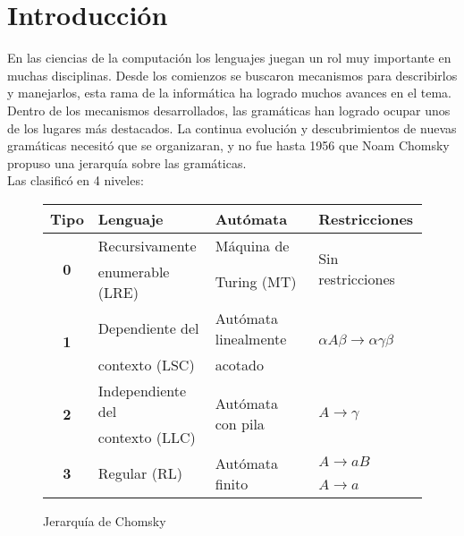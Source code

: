 \chapter{Introducción}
\label{chap:intro}
\minitoc

En las ciencias de la computación los lenguajes juegan un rol muy importante en muchas disciplinas. Desde los comienzos
se buscaron mecanismos para describirlos y manejarlos, esta rama de la informática ha logrado muchos avances en el tema.
Dentro de los mecanismos desarrollados, las gramáticas han logrado ocupar unos de los lugares más destacados. La continua 
evolución y descubrimientos de nuevas gramáticas necesitó que se organizaran, y no fue hasta 1956 que Noam Chomsky propuso
una jerarquía sobre las gramáticas.\\
Las clasificó en 4 niveles:\\

\begin{figure}[h!]\centering 
\begin{tabular}{| c | p{3.5cm} | p{4cm} | p{3cm} |}
\hline

\rowcolor{gris} \textbf{Tipo} & \textbf{Lenguaje} & \textbf{Autómata} & \textbf{Restricciones} \\ \hline

\multirow{2}{*}{\textbf{0}} & Recursivamente   & Máquina de  & \multirow{2}{*}{Sin restricciones} \\ 
                            & enumerable (LRE) & Turing (MT) & \\ \hline

\multirow{2}{*}{\textbf{1}} & Dependiente del & Autómata linealmente & \multirow{2}{*}{$\alpha A \beta \rightarrow \alpha\gamma\beta$} \\ 
                            & contexto (LSC)  & acotado              & \\ \hline

\multirow{2}{*}{\textbf{2}} & Independiente del & \multirow{2}{*}{Autómata con pila} & \multirow{2}{*}{$A \rightarrow \gamma$} \\ 
                            & contexto (LLC)    &                   & \\ \hline

\multirow{2}{*}{\textbf{3}} & \multirow{2}{*}{Regular (RL)} & \multirow{2}{*}{Autómata finito} & $A \rightarrow aB$ \\ 
                            &              &                 & $A \rightarrow a$ \\ \hline
\end{tabular}\caption{\label{chomsky} Jerarquía de Chomsky}
\end{figure}

